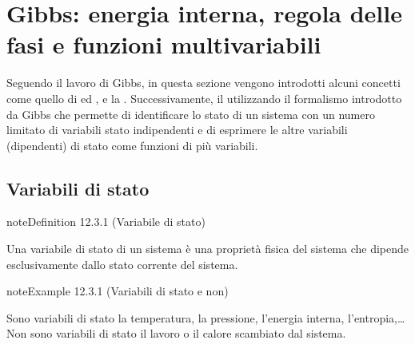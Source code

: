 \documentclass[letterpaper,10pt,italian]{jupyterBook}
\begin{document}
\section{Gibbs: energia interna, regola delle fasi e funzioni multi\sphinxhyphen{}variabili}
\label{\detokenize{ch/thermodynamics/principles-gibbs-phase-rule:gibbs-energia-interna-regola-delle-fasi-e-funzioni-multi-variabili}}\label{\detokenize{ch/thermodynamics/principles-gibbs-phase-rule:physics-hs-thermodynamics-foundation-principles-gibbs-phase-rule}}\label{\detokenize{ch/thermodynamics/principles-gibbs-phase-rule::doc}}
\sphinxAtStartPar
Seguendo il lavoro di Gibbs, in questa sezione vengono introdotti alcuni concetti come quello di {\hyperref[\detokenize{ch/thermodynamics/principles-gibbs-phase-rule:physics-hs-thermodynamics-foundation-principles-gibbs-phase-rule-state-vars}]{}} ed {\hyperref[\detokenize{ch/thermodynamics/principles-gibbs-phase-rule:physics-hs-thermodynamics-foundation-principles-gibbs-phase-rule-internal-energy}]{}}, e la {\hyperref[\detokenize{ch/thermodynamics/principles-gibbs-phase-rule:physics-hs-thermodynamics-foundation-principles-gibbs-phase-rule-gibbs-phase-rule}]{}}. Successivamente, il {\hyperref[\detokenize{ch/thermodynamics/principles-gibbs-phase-rule:physics-hs-thermodynamics-foundation-principles-gibbs-phase-rule-first}]{}} utilizzando il formalismo introdotto da Gibbs che permette di identificare lo stato di un sistema con un numero limitato di variabili stato indipendenti e di esprimere le altre variabili (dipendenti) di stato come funzioni di più variabili.


\subsection{Variabili di stato}
\label{\detokenize{ch/thermodynamics/principles-gibbs-phase-rule:variabili-di-stato}}\label{\detokenize{ch/thermodynamics/principles-gibbs-phase-rule:physics-hs-thermodynamics-foundation-principles-gibbs-phase-rule-state-vars}}\label{ch/thermodynamics/principles-gibbs-phase-rule:definition-0}
\begin{sphinxadmonition}{note}{Definition 12.3.1 (Variabile di stato)}



\sphinxAtStartPar
Una variabile di stato di un sistema è una proprietà fisica del sistema che dipende esclusivamente dallo stato corrente del sistema.
\end{sphinxadmonition}
\label{ch/thermodynamics/principles-gibbs-phase-rule:example-1}
\begin{sphinxadmonition}{note}{Example 12.3.1 (Variabili di stato e non)}



\sphinxAtStartPar
Sono variabili di stato la temperatura, la pressione, l’energia interna, l’entropia,…
Non sono variabili di stato il lavoro o il calore scambiato dal sistema. 
\end{sphinxadmonition}
\end{document}
